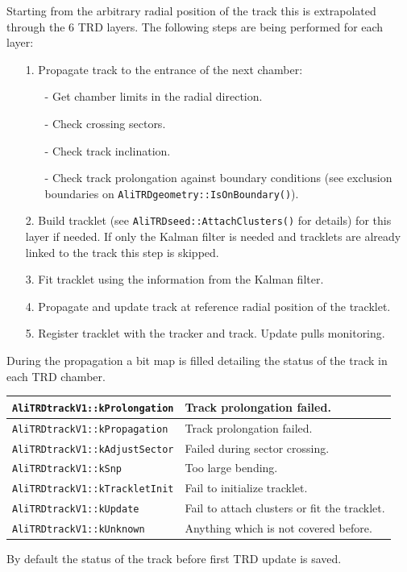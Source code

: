 \documentclass{alicetdr}
\begin{document}
Starting from the arbitrary radial position of the track this is
extrapolated through the 6 TRD layers. The following steps
are being performed for each layer:
\begin{itemize}
\item[1.] Propagate track to the entrance of the next chamber:
  \begin{itemize}
  \item[-] Get chamber limits in the radial direction.
  \item[-] Check crossing sectors.
  \item[-] Check track inclination.
  \item[-] Check track prolongation against boundary conditions (see exclusion 
           boundaries on {\tt AliTRDgeometry::IsOnBoundary()}).
  \end{itemize}
\item[2.] Build tracklet (see {\tt AliTRDseed::AttachClusters()} for details) for 
          this layer if needed. If only the Kalman filter is needed and tracklets 
          are already linked to the track this step is skipped.
\item[3.] Fit tracklet using the information from the Kalman filter.
\item[4.] Propagate and update track at reference radial position of the tracklet.
\item[5.] Register tracklet with the tracker and track. Update pulls monitoring.
\end{itemize}

During the propagation a bit map is filled detailing the status of the track in 
each TRD chamber.
\begin{center}
\begin{tabular}{|l|l|}  \hline
{\tt AliTRDtrackV1::kProlongation} & Track prolongation failed.                   \\ \hline
{\tt AliTRDtrackV1::kPropagation}  & Track prolongation failed.                   \\ \hline
{\tt AliTRDtrackV1::kAdjustSector} & Failed during sector crossing.               \\ \hline
{\tt AliTRDtrackV1::kSnp}          & Too large bending.                           \\ \hline
{\tt AliTRDtrackV1::kTrackletInit} & Fail to initialize tracklet.                 \\ \hline
{\tt AliTRDtrackV1::kUpdate}       & Fail to attach clusters or fit the tracklet. \\ \hline
{\tt AliTRDtrackV1::kUnknown}      & Anything which is not covered before.        \\ \hline
\end{tabular}
\end{center}
By default the status of the track before first TRD update is saved. 
\end{document}
